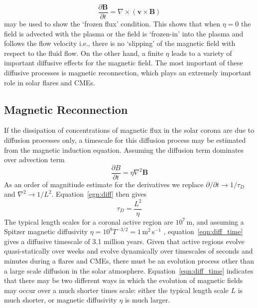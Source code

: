 \begin{equation}
\frac{\partial \mathbf{B}}{\partial t} = \nabla \times(\mathbf{v}\times \mathbf{B})
\end{equation}
may be used to show the \textquoteleft frozen flux' condition. This shows that when $\eta = 0$ the field is advected with the plasma or the field is \textquoteleft frozen-in' into the plasma and follows the flow velocity i.e., there is no `slipping' of the magnetic field with respect to the fluid flow.  On the other hand, a finite $\eta$ leads to a variety of important diffusive effects for the magnetic field. The most important of these diffusive processes is magnetic reconnection, which plays an extremely important role in solar flares and CMEs.



\subsection{Magnetic Reconnection}\label{sec:13}

If the dissipation of concentrations of magnetic flux in the solar corona are due to diffusion processes only, a timescale for this diffusion process may be estimated from the magnetic induction equation. Assuming the diffusion term dominates over advection term
\begin{equation}
\frac{\partial B}{\partial t} = \eta\nabla^2\mathbf{B}
\label{egn:diff}
\end{equation}
As an order of magnitiude estimate for the derivatives we replace $\partial/\partial t \rightarrow 1/\tau_D$ and $\nabla^2 \rightarrow 1/L^2$. Equation~\ref{egn:diff} then gives
\begin{equation}
\tau_D = \frac{L^2}{\eta}
\label{eqn:diff_time}
\end{equation}
The typical length scales for a coronal active region are $10^7$\,m, and assuming a Spitzer magnetic diffusivity $\eta = 10^9T^{-3/2} = 1$\,m$^2$\,s$^{-1}$ \citep{spitzer1962}, equation~\ref{eqn:diff_time} gives a diffusive timescale of 3.1 million years.
Given that active regions evolve quasi-statically over weeks and evolve dynamically over timescales of seconds and minutes during a flares and CMEs, there must be an evolution process other than a large scale diffusion in the solar atmosphere. Equation~\ref{eqn:diff_time} indicates that there may be two different ways in which the evolution of magnetic fields may occur over a much shorter times scale: either the typical length scale $L$ is much shorter, or magnetic diffusivity $\eta$ is much larger.

